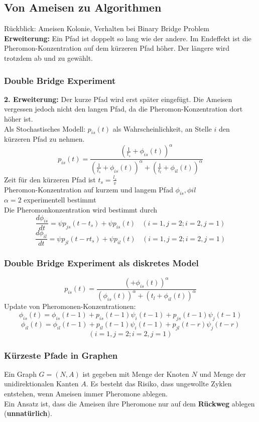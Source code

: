 \documentclass[a4paper]{article}
\begin{document}
\subsection{Von Ameisen zu Algorithmen}
Rückblick: Ameisen Kolonie, Verhalten bei Binary Bridge Problem\\
\textbf{Erweiterung:} Ein Pfad ist doppelt so lang wie der andere. Im Endeffekt ist die Pheromon-Konzentration auf dem kürzeren Pfad höher. Der längere wird trotzdem ab und zu gewählt.\\
\subsubsection{Double Bridge Experiment}
\textbf{2. Erweiterung:} Der kurze Pfad wird erst später eingefügt. Die Ameisen vergessen jedoch nicht den langen Pfad, da die Pheromon-Konzentration dort höher ist.\\
Als Stochastisches Modell: $p_{is}(t)$ als Wahrscheinlichkeit, an Stelle $i$ den kürzeren Pfad zu nehmen.
$$p_{is}(t) = \dfrac{(\frac{1}{t_s}+\phi_{is}(t))^\alpha}{(\frac{1}{t_s}+\phi_{is}(t))^\alpha + (\frac{1}{t_l}+\phi_{il}(t))^\alpha}$$
Zeit für den kürzeren Pfad ist $t_s = \frac{l_s}{v}$\\
Pheromon-Konzentration auf kurzem und langem Pfad $\phi_{is}, \phi{il}$\\
$\alpha = 2$ experimentell bestimmt\\

Die Pheromonkonzentration wird bestimmt durch
$$\dfrac{d\phi_{is}}{dt}=\psi p_{js}(t-t_s)+\psi p_{is}(t) \ \ \ \ (i=1,j=2;i=2,j=1)$$
$$\dfrac{d\phi_{il}}{dt}=\psi p_{jl}(t-rt_s)+\psi p_{il}(t) \ \ \ \ (i=1,j=2;i=2,j=1)$$
\subsubsection{Double Bridge Experiment als diskretes Model}
$$p_{is}(t) = \dfrac{(+\phi_{is}(t))^\alpha}{(\phi_{is}(t))^\alpha + ({t_l}+\phi_{il}(t))^\alpha}$$
Update von Pheromonen-Konzentrationen:
$$\phi_{is}(t)=\phi_{is}(t-1)+p_{is}(t-1)\psi_i(t-1)+p_{js}(t-1)\psi_{j} (t-1)$$
$$\phi_{il}(t)=\phi_{il}(t-1)+p_{il}(t-1)\psi_i(t-1)+p_{jl}(t-r)\psi_{j} (t-r)$$
$$(i=1,j=2;i=2,j=1)$$
\subsubsection{Kürzeste Pfade in Graphen}
Ein Graph $G=(N,A)$ ist gegeben mit Menge der Knoten $N$ und Menge der unidirektionalen Kanten $A$. Es besteht das Risiko, dass ungewollte Zyklen entstehen, wenn Ameisen immer Pheromone ablegen. \\
Ein Ansatz ist, dass die Ameisen ihre Pheromone nur auf dem \textbf{Rückweg} ablegen (\textbf{unnatürlich}).\\
\end{document}
